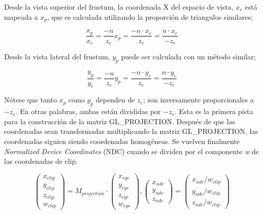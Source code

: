 Desde la vista superior del frustum, la coordenada X del espacio de vista, $x_e$ está mapeada a $x_p$, que es calculada utilizando la proporción de triangulos similares;
\begin{figure} [h]
  \centering
  \[
  \frac{x_p}{x_e} = \frac{-n}{z_e}
  x_p = \frac{-n \cdot x_e}{z_e} = \frac{n \cdot x_e}{-z_e}
  \]
\end{figure}

Desde la vista lateral del frustum, $y_p$ puede ser calculada con un método similar;

\begin{figure} [h]
  \centering
  \[ \frac{y_p}{y_e} = \frac{-n}{z_e}
  y_p = \frac{-n \cdot y_e}{z_e} = \frac{n \cdot y_e}{-z_e} \]
\end{figure}

\newpage

Nótese que tanto $x_p$ como $y_p$ dependen de $z_e$; son inversamente proporcionales a $-z_e$. En otras palabras, ambas están divididas por $-z_e$. Esta es la primera pista para la construcción de la matriz GL\_PROJECTION. Después de que las coordenadas sean transformadas multiplicando la matriz GL\_PROJECTION, las coordenadas siguien siendo coordenadas homogéneas. Se vuelven finalmente \textit{Normalized Device Coordinates} (NDC) cuando se dividen por el componente \textit{w} de las coordenadas de clip.

\begin{figure} [h]
  \centering
  \[
  \begin{pmatrix}
    x_{clip} \\ y_{clip} \\ z_{clip} \\ w_{clip}
  \end{pmatrix}
  =
  M_{projection} \cdot
  \begin{pmatrix}
    x_{eye} \\ y_{eye} \\ z_{eye} \\ w_{eye}
  \end{pmatrix} ,
  \begin{pmatrix}
    x_{ndc} \\ y_{ndc} \\ z_{ndc}
  \end{pmatrix}
  =
  \begin{pmatrix}
    x_{ndc}/w_{clip} \\ y_{ndc}/w_{clip} \\ z_{ndc}/w_{clip}
  \end{pmatrix}
  \]
\end{figure}


